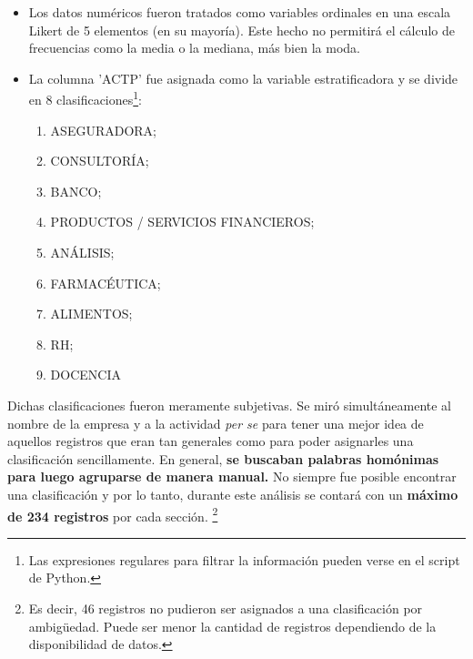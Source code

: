 \documentclass{article}
\begin{document}
\begin{itemize}
    \item Los datos numéricos fueron tratados como variables ordinales en una escala Likert de 5 elementos (en su mayoría). Este hecho no permitirá el cálculo de frecuencias como la media o la mediana, más bien la moda. 
    
    \item La columna 'ACTP' fue asignada como la variable estratificadora y se divide en 8 clasificaciones\footnote{Las expresiones regulares para filtrar la información pueden verse en el script de Python. }:
    
    \begin{enumerate}
        \item ASEGURADORA;
        
        \item CONSULTORÍA;
        
        \item BANCO;
        
        \item PRODUCTOS / SERVICIOS FINANCIEROS;
        
        \item ANÁLISIS;
        
        \item FARMACÉUTICA;
        
        \item ALIMENTOS;
        
        \item RH;
        
        \item DOCENCIA
    \end{enumerate}
    
\end{itemize}

Dichas clasificaciones fueron meramente subjetivas. Se miró simultáneamente al nombre de la empresa y a la actividad \textit{per se} para tener una mejor idea de aquellos registros que eran tan generales como para poder asignarles una clasificación sencillamente. En general, \textbf{se buscaban palabras homónimas para luego agruparse de manera manual.} No siempre fue posible encontrar una clasificación y por lo tanto, durante este análisis se contará con un \textbf{máximo de 234 registros} por cada sección. \footnote{Es decir, 46 registros no pudieron ser asignados a una clasificación por ambigüedad. Puede ser menor la cantidad de registros dependiendo de la disponibilidad de datos.}
    
\end{document}
